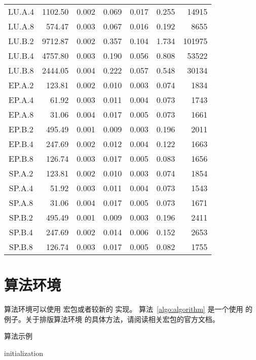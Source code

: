 \begin{longtable}[c]{c*{6}{r}}
  LU.A.4 & 1102.50 & 0.002 & 0.069 & 0.017 & 0.255 & 14915 \\
  LU.A.8 & 574.47 & 0.003 & 0.067 & 0.016 & 0.192 & 8655 \\
  LU.B.2 & 9712.87 & 0.002 & 0.357 & 0.104 & 1.734 & 101975 \\
  LU.B.4 & 4757.80 & 0.003 & 0.190 & 0.056 & 0.808 & 53522 \\
  LU.B.8 & 2444.05 & 0.004 & 0.222 & 0.057 & 0.548 & 30134 \\
  EP.A.2 & 123.81 & 0.002 & 0.010 & 0.003 & 0.074 & 1834 \\
  EP.A.4 & 61.92 & 0.003 & 0.011 & 0.004 & 0.073 & 1743 \\
  EP.A.8 & 31.06 & 0.004 & 0.017 & 0.005 & 0.073 & 1661 \\
  EP.B.2 & 495.49 & 0.001 & 0.009 & 0.003 & 0.196 & 2011 \\
  EP.B.4 & 247.69 & 0.002 & 0.012 & 0.004 & 0.122 & 1663 \\
  EP.B.8 & 126.74 & 0.003 & 0.017 & 0.005 & 0.083 & 1656 \\
  SP.A.2 & 123.81 & 0.002 & 0.010 & 0.003 & 0.074 & 1854 \\
  SP.A.4 & 51.92 & 0.003 & 0.011 & 0.004 & 0.073 & 1543 \\
  SP.A.8 & 31.06 & 0.004 & 0.017 & 0.005 & 0.073 & 1671 \\
  SP.B.2 & 495.49 & 0.001 & 0.009 & 0.003 & 0.196 & 2411 \\
  SP.B.4 & 247.69 & 0.002 & 0.014 & 0.006 & 0.152 & 2653 \\
  SP.B.8 & 126.74 & 0.003 & 0.017 & 0.005 & 0.082 & 1755 \\
  \bottomrule
\end{longtable}

\section{算法环境}

算法环境可以使用  宏包或者较新的  实现。
算法~\ref{algo:algorithm} 是一个使用  的例子。关于排版算法环境
的具体方法，请阅读相关宏包的官方文档。

\begin{algorithm}[htb]
  \caption{算法示例}
  \label{algo:algorithm}
  \small
  \SetAlgoLined

  initialization\;
\end{algorithm}

